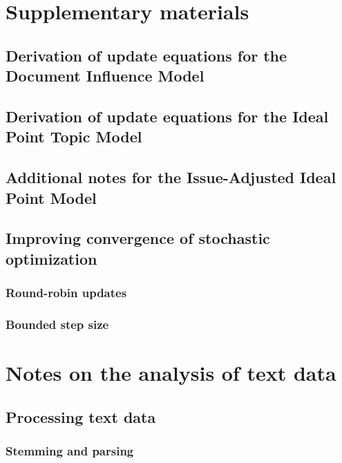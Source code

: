 \chapter{Supplementary materials}
\label{chapter:supplementary_materials}

\section{Derivation of update equations for the Document Influence Model}


\section{Derivation of update equations for the Ideal Point Topic Model}


\section{Additional notes for the Issue-Adjusted Ideal Point Model}


\section{Improving convergence of stochastic optimization}

\subsection{Round-robin updates}

\subsection{Bounded step size}

\chapter{Notes on the analysis of text data}
\label{chapter:notes_text}
\section{Processing text data}

\subsection{Stemming and parsing}


